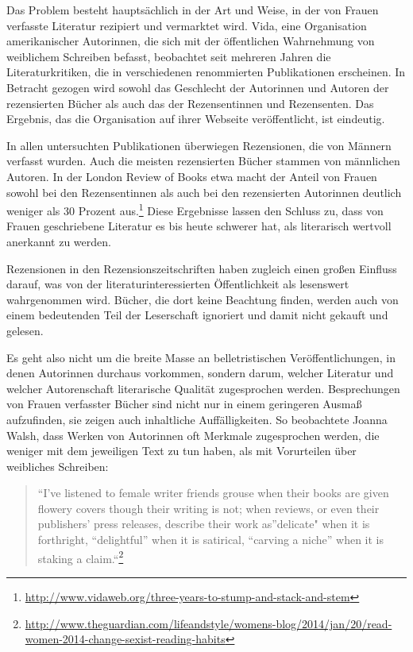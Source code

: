 \documentclass[a4paper,
fontsize=11pt,
oneside,
numbers=noperiodatend,
parskip=half-,
bibliography=totoc,
final
]{scrartcl}
\begin{document}
Das Problem besteht hauptsächlich in der Art und Weise, in der von
Frauen verfasste Literatur rezipiert und vermarktet wird. Vida, eine
Organisation amerikanischer Autorinnen, die sich mit der öffentlichen
Wahrnehmung von weiblichem Schreiben befasst, beobachtet seit mehreren
Jahren die Literaturkritiken, die in verschiedenen renommierten
Publikationen erscheinen. In Betracht gezogen wird sowohl das Geschlecht
der Autorinnen und Autoren der rezensierten Bücher als auch das der
Rezensentinnen und Rezensenten. Das Ergebnis, das die Organisation auf
ihrer Webseite veröffentlicht, ist eindeutig.~

In allen untersuchten Publikationen überwiegen Rezensionen, die von
Männern verfasst wurden. Auch die meisten rezensierten Bücher stammen
von männlichen Autoren. In der London Review of Books etwa macht der
Anteil von Frauen sowohl bei den Rezensentinnen als auch bei den
rezensierten Autorinnen deutlich weniger als 30 Prozent aus.\footnote{\url{http://www.vidaweb.org/three-years-to-stump-and-stack-and-stem}}
Diese Ergebnisse lassen den Schluss zu, dass von Frauen geschriebene
Literatur es bis heute schwerer hat, als literarisch wertvoll anerkannt
zu werden.

Rezensionen in den Rezensionszeitschriften haben zugleich einen großen
Einfluss darauf, was von der literaturinteressierten Öffentlichkeit als
lesenswert wahrgenommen wird. Bücher, die dort keine Beachtung finden,
werden auch von einem bedeutenden Teil der Leserschaft ignoriert und
damit nicht gekauft und gelesen.~

Es geht also nicht um die breite Masse an belletristischen
Veröffentlichungen, in denen Autorinnen durchaus vorkommen, sondern
darum, welcher Literatur und welcher Autorenschaft literarische Qualität
zugesprochen werden. Besprechungen von Frauen verfasster Bücher sind
nicht nur in einem geringeren Ausmaß aufzufinden, sie zeigen auch
inhaltliche Auffälligkeiten. So beobachtete Joanna Walsh, dass Werken
von Autorinnen oft Merkmale zugesprochen werden, die weniger mit dem
jeweiligen Text zu tun haben, als mit Vorurteilen über weibliches
Schreiben:

\begin{quote}
\enquote{I've listened to female writer friends grouse when their books
are given flowery covers though their writing is not; when reviews, or
even their publishers' press releases, describe their work as}delicate"
when it is forthright, \enquote{delightful} when it is satirical,
\enquote{carving a niche} when it is staking a claim.``\footnote{\url{http://www.theguardian.com/lifeandstyle/womens-blog/2014/jan/20/read-women-2014-change-sexist-reading-habits}}
\end{quote}
\end{document}

